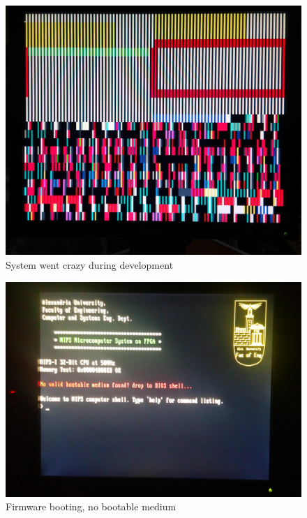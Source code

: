 \documentclass[oneside]{book}
\begin{document}
\begin{figure}
\begin{center}
\includegraphics[width=20cm]{res_crazy.jpg}
\end{center}
\caption{System went crazy during development}
\end{figure}

\begin{figure}
\begin{center}
\includegraphics[width=20cm]{res_bios.jpg}
\end{center}
\caption{Firmware booting, no bootable medium}
\end{figure}
\end{document}
